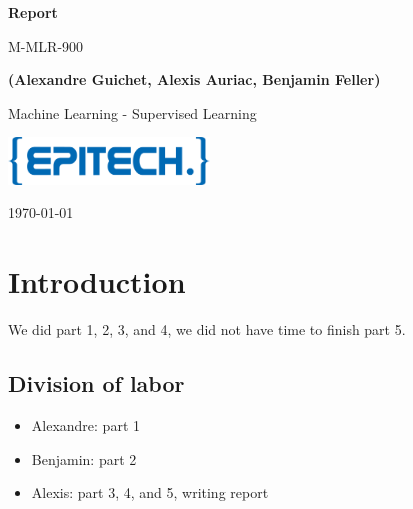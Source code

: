 \documentclass[10pt, a4paper]{article}
\newcommand\course{Machine Learning - Supervised Learning}
\newcommand\hwnumber{M-MLR-900}
\newcommand\Information{(Alexandre Guichet, Alexis Auriac, Benjamin Feller)}
\begin{document}
\begin{titlepage}
    \begin{center}
        \vspace*{3cm}
            
        \Huge
        \textbf{Report}
            
        \vspace{1cm}
        \huge
        \hwnumber
            
        \vspace{1.5cm}
        \Large
            
        \textbf{\Information}                      %
        
            
        \vfill
        
        \course
            
        \vspace{1cm}
            
        \includegraphics[width=0.4\textwidth]{epitech_logo.png}

        \Large
        
        \today
            
    \end{center}
\end{titlepage}

\newpage


\section*{Introduction}

We did part 1, 2, 3, and 4, we did not have time to finish part 5.

\subsection*{Division of labor}

\begin{itemize}
    \item Alexandre: part 1
    \item Benjamin: part 2
    \item Alexis: part 3, 4, and 5, writing report
\end{itemize}
\end{document}

